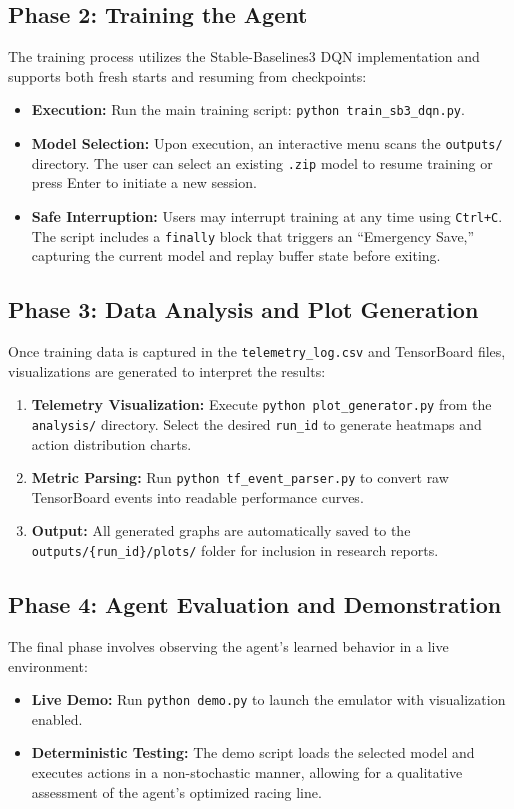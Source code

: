 \documentclass[11pt,a4paper]{article}
\begin{document}
\subsection{Phase 2: Training the Agent}
The training process utilizes the Stable-Baselines3 DQN implementation and supports both fresh starts and resuming from checkpoints:
\begin{itemize}
    \item \textbf{Execution:} Run the main training script: \texttt{python train\_sb3\_dqn.py}.
    \item \textbf{Model Selection:} Upon execution, an interactive menu scans the \texttt{outputs/} directory. The user can select an existing \texttt{.zip} model to resume training or press Enter to initiate a new session.
    \item \textbf{Safe Interruption:} Users may interrupt training at any time using \texttt{Ctrl+C}. The script includes a \texttt{finally} block that triggers an ``Emergency Save,'' capturing the current model and replay buffer state before exiting.
\end{itemize}

\subsection{Phase 3: Data Analysis and Plot Generation}
Once training data is captured in the \texttt{telemetry\_log.csv} and TensorBoard files, visualizations are generated to interpret the results:
\begin{enumerate}
    \item \textbf{Telemetry Visualization:} Execute \texttt{python plot\_generator.py} from the \texttt{analysis/} directory. Select the desired \texttt{run\_id} to generate heatmaps and action distribution charts.
    \item \textbf{Metric Parsing:} Run \texttt{python tf\_event\_parser.py} to convert raw TensorBoard events into readable performance curves.
    \item \textbf{Output:} All generated graphs are automatically saved to the \texttt{outputs/\{run\_id\}/plots/} folder for inclusion in research reports.
\end{enumerate}

\subsection{Phase 4: Agent Evaluation and Demonstration}
The final phase involves observing the agent's learned behavior in a live environment:
\begin{itemize}
    \item \textbf{Live Demo:} Run \texttt{python demo.py} to launch the emulator with visualization enabled.
    \item \textbf{Deterministic Testing:} The demo script loads the selected model and executes actions in a non-stochastic manner, allowing for a qualitative assessment of the agent's optimized racing line.
\end{itemize}
\end{document}
